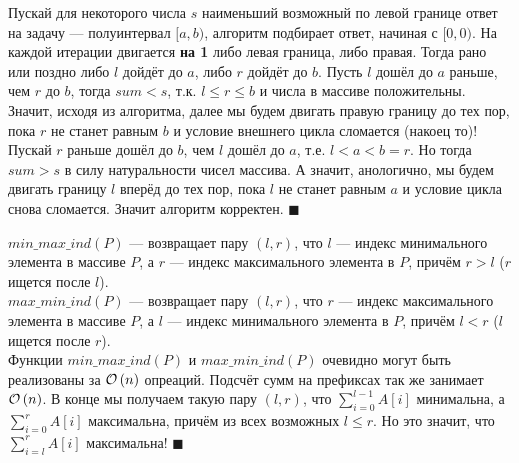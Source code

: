 Пускай для некоторого числа $s$ наименьший возможный по левой границе ответ на задачу --- полуинтервал $[a, b)$, 
алгоритм подбирает ответ, начиная с $[0, 0)$. На каждой итерации двигается \textbf{на 1} либо левая граница, либо правая.
Тогда рано или поздно либо $l$ дойдёт до $a$, либо $r$ дойдёт до $b$. Пусть $l$ дошёл до $a$ раньше, чем $r$ до $b$, тогда
$sum < s$, т.к. $l \leq r \leq b$ и числа в массиве положительны. Значит, исходя из алгоритма, далее мы будем двигать правую
границу до тех пор, пока $r$ не станет равным $b$ и условие внешнего цикла сломается (накоец то)! Пускай $r$ раньше дошёл
до $b$, чем $l$ дошёл до $a$, т.е. $l < a < b = r$. Но тогда $sum > s$ в силу натуральности чисел массива. А значит, анологично,
мы будем двигать границу $l$ вперёд до тех пор, пока $l$ не станет равным $a$ и условие цикла снова сломается. Значит
алгоритм корректен. \hfill $\blacksquare$ 

\begin{algorithmic}[1]
\EndFor
{}
\Else
\EndIf
\end{algorithmic}
$min\_max\_ind(P)$ --- возвращает пару $(l, r)$, что $l$ --- индекс минимального элемента в массиве $P$, а $r$ --- индекс
максимального элемента в $P$, причём $r > l$ ($r$ ищется после $l$).\\
$max\_min\_ind(P)$ --- возвращает пару $(l, r)$, что $r$ --- индекс максимального элемента в массиве $P$, а $l$ --- индекс
минимального элемента в $P$, причём $l < r$ ($l$ ищется после $r$).\\


Функции $min\_max\_ind(P)$ и $max\_min\_ind(P)$ очевидно могут быть реализованы за $\mathcal{O}\left(n\right)$ опреаций. Подсчёт сумм на
префиксах так же занимает $\mathcal{O}\left(n\right)$. В конце мы получаем такую пару $(l, r)$, что $\sum_{i=0}^{l-1}{A[i]}$ минимальна,
а $\sum_{i=0}^{r}{A[i]}$ максимальна, причём из всех возможных $l \leq r$. Но это значит, что $\sum_{i=l}^{r}{A[i]}$
максимальна! \hfill $\blacksquare$
